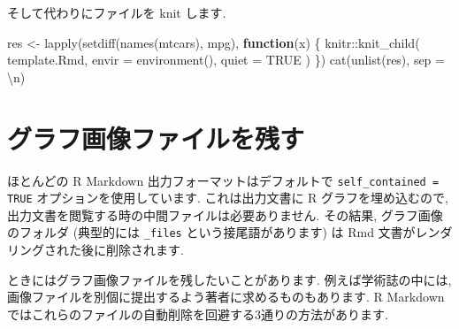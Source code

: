 \documentclass[
  11pt,
  lualatex,ja=standard,jafont=noto]{bxjsreport}
\newenvironment{Shaded}{\begin{snugshade}}{\end{snugshade}}
\newcommand{\AttributeTok}[1]{\textcolor[rgb]{0.77,0.63,0.00}{#1}}
\newcommand{\ConstantTok}[1]{\textcolor[rgb]{0.00,0.00,0.00}{#1}}
\newcommand{\ControlFlowTok}[1]{\textcolor[rgb]{0.13,0.29,0.53}{\textbf{#1}}}
\newcommand{\FunctionTok}[1]{\textcolor[rgb]{0.00,0.00,0.00}{#1}}
\newcommand{\NormalTok}[1]{#1}
\newcommand{\OtherTok}[1]{\textcolor[rgb]{0.56,0.35,0.01}{#1}}
\newcommand{\SpecialCharTok}[1]{\textcolor[rgb]{0.00,0.00,0.00}{#1}}
\newcommand{\StringTok}[1]{\textcolor[rgb]{0.31,0.60,0.02}{#1}}
\begin{document}
そして代わりにファイルを knit します.

\begin{Shaded}
\begin{Highlighting}[numbers=left,,]
\NormalTok{res }\OtherTok{\textless{}{-}} \FunctionTok{lapply}\NormalTok{(}\FunctionTok{setdiff}\NormalTok{(}\FunctionTok{names}\NormalTok{(mtcars), }\StringTok{\textquotesingle{}mpg\textquotesingle{}}\NormalTok{), }\ControlFlowTok{function}\NormalTok{(x) \{}
\NormalTok{  knitr}\SpecialCharTok{::}\FunctionTok{knit\_child}\NormalTok{(}
    \StringTok{\textquotesingle{}template.Rmd\textquotesingle{}}\NormalTok{, }\AttributeTok{envir =} \FunctionTok{environment}\NormalTok{(), }\AttributeTok{quiet =} \ConstantTok{TRUE}
\NormalTok{  )}
\NormalTok{\})}
\FunctionTok{cat}\NormalTok{(}\FunctionTok{unlist}\NormalTok{(res), }\AttributeTok{sep =} \StringTok{\textquotesingle{}}\SpecialCharTok{\textbackslash{}n}\StringTok{\textquotesingle{}}\NormalTok{)}
\end{Highlighting}
\end{Shaded}

\hypertarget{keep-files}{%
\section{グラフ画像ファイルを残す}\label{keep-files}}

ほとんどの R Markdown 出力フォーマットはデフォルトで \texttt{self\_contained = TRUE} オプションを使用しています. これは出力文書に R グラフを埋め込むので, 出力文書を閲覧する時の中間ファイルは必要ありません. その結果, グラフ画像のフォルダ (典型的には \texttt{\_files} という接尾語があります) は Rmd 文書がレンダリングされた後に削除されます.

ときにはグラフ画像ファイルを残したいことがあります. 例えば学術誌の中には, 画像ファイルを別個に提出するよう著者に求めるものもあります. R Markdown ではこれらのファイルの自動削除を回避する3通りの方法があります.
\end{document}
